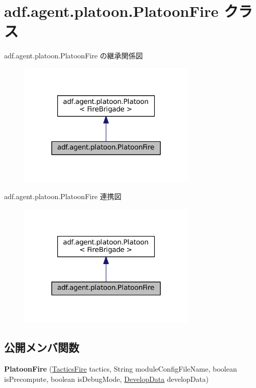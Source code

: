 \hypertarget{classadf_1_1agent_1_1platoon_1_1PlatoonFire}{}\section{adf.\+agent.\+platoon.\+Platoon\+Fire クラス}
\label{classadf_1_1agent_1_1platoon_1_1PlatoonFire}


adf.\+agent.\+platoon.\+Platoon\+Fire の継承関係図
\nopagebreak
\begin{figure}[H]
\begin{center}
\leavevmode
\includegraphics[width=239pt]{classadf_1_1agent_1_1platoon_1_1PlatoonFire__inherit__graph}
\end{center}
\end{figure}


adf.\+agent.\+platoon.\+Platoon\+Fire 連携図
\nopagebreak
\begin{figure}[H]
\begin{center}
\leavevmode
\includegraphics[width=239pt]{classadf_1_1agent_1_1platoon_1_1PlatoonFire__coll__graph}
\end{center}
\end{figure}
\subsection*{公開メンバ関数}
\begin{DoxyCompactItemize}
\item 
\hypertarget{classadf_1_1agent_1_1platoon_1_1PlatoonFire_a0c1752e66c54284e31a78de7acaefe47}{}\label{classadf_1_1agent_1_1platoon_1_1PlatoonFire_a0c1752e66c54284e31a78de7acaefe47} 
{\bfseries Platoon\+Fire} (\hyperlink{classadf_1_1component_1_1tactics_1_1TacticsFire}{Tactics\+Fire} tactics, String module\+Config\+File\+Name, boolean is\+Precompute, boolean is\+Debug\+Mode, \hyperlink{classadf_1_1agent_1_1develop_1_1DevelopData}{Develop\+Data} develop\+Data)
\end{DoxyCompactItemize}
